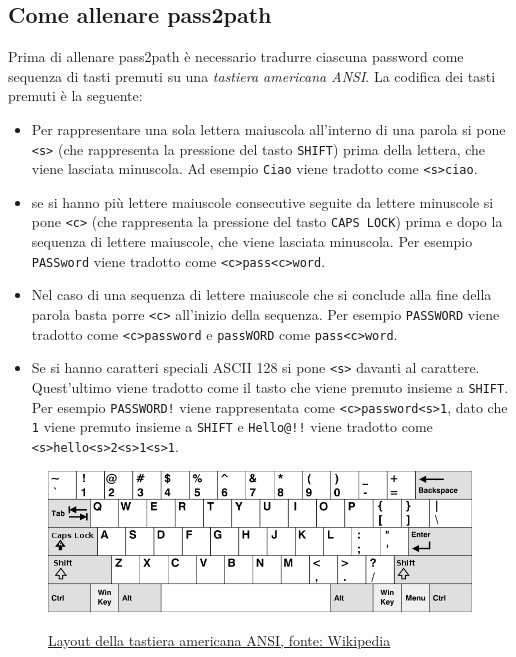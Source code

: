 \subsection{Come allenare pass2path}
\label{sec:allenamento pass2path}
Prima di allenare pass2path è necessario tradurre ciascuna password come sequenza di tasti premuti su una \emph{tastiera americana ANSI}. La codifica dei tasti premuti è la seguente:
\begin{itemize}
    \item Per rappresentare una sola lettera maiuscola all'interno di una parola si pone \texttt{<s>} (che rappresenta la pressione del tasto \texttt{SHIFT}) prima della lettera, che viene lasciata minuscola. Ad esempio \texttt{Ciao} viene tradotto come \texttt{<s>ciao}.
    \item se si hanno più lettere maiuscole consecutive seguite da lettere minuscole si pone \texttt{<c>} (che rappresenta la pressione del tasto \texttt{CAPS LOCK}) prima e dopo la sequenza di lettere maiuscole, che viene lasciata minuscola. Per esempio \texttt{PASSword} viene tradotto come \texttt{<c>pass<c>word}.
    \item Nel caso di una sequenza di lettere maiuscole che si conclude alla fine della parola basta porre \texttt{<c>} all'inizio della sequenza. Per esempio \texttt{PASSWORD} viene tradotto come \texttt{<c>password} e \texttt{passWORD} come \texttt{pass<c>word}.
    \item Se si hanno caratteri speciali ASCII 128 si pone \texttt{<s>} davanti al carattere.
    \\
    Quest'ultimo viene tradotto come il tasto che viene premuto insieme a \texttt{SHIFT}.
    Per esempio \texttt{PASSWORD!} viene rappresentata come \texttt{<c>password<s>1}, dato che \texttt{1} viene premuto insieme a \texttt{SHIFT} e \texttt{Hello@!!} viene tradotto come
    \\
    \texttt{<s>hello<s>2<s>1<s>1}.
\end{itemize}

\begin{figure}[h]
    \centering
    \includegraphics[width=15cm]{./immagini/US_keyboard_layout.png}
    \label{US layout}
    \caption{\href{https://upload.wikimedia.org/wikipedia/commons/thumb/5/51/KB_United_States-NoAltGr.svg/800px-KB_United_States-NoAltGr.svg.png}{Layout della tastiera americana ANSI, fonte: Wikipedia}}
\end{figure}

